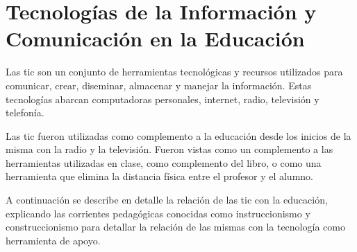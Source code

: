 \chapter[TIC's en la Educación]{Tecnologías de la Información y Comunicación en
    la Educación}
\label{chap:tics}


Las \Gls{tic} son un conjunto de herramientas tecnológicas y recursos utilizados
para comunicar, crear, diseminar, almacenar y manejar la
información\cite{unesco:ict}. Estas tecnologías abarcan computadoras personales,
internet, radio, televisión y telefonía\cite{tinio:ict}.

Las \Gls{tic} fueron utilizadas como complemento a la educación desde los
inicios de la misma con la radio y la televisión. Fueron vistas como un
complemento a las herramientas utilizadas en clase, como complemento del libro,
o como una herramienta que elimina la distancia física entre el profesor y el
alumno\cite{unesco:ict}. 

A continuación se describe en detalle la relación de las  \Gls{tic} con la
educación, explicando las corrientes pedagógicas conocidas como instruccionismo
y construccionismo para detallar la relación de las mismas con la tecnología
como herramienta de apoyo.







% 
% 
% 
% 
% 
% 
% 
% 
% 
% 
% 
% 
% 
% 
